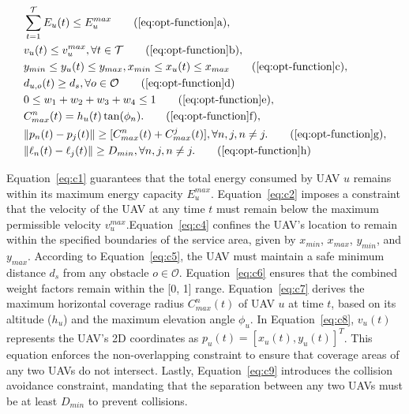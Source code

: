 \documentclass[conference]{IEEEtran}
\begin{document}
\begingroup
\allowdisplaybreaks
\begin{align}    
     & \sum_{t=1}^{\mathcal{T}} E_{u}(t) \leq E_u^{max} \tag{\ref{eq:opt-function}a}\label{eq:c1} ,\\
     & v_u(t) \leq v_u^{max},  \forall t \in \mathcal{T} \tag{\ref{eq:opt-function}b} \label{eq:c2} ,\\
    & y_{min} \leq y_u(t) \leq y_{max} , x_{min} \leq x_u(t) \leq x_{max}
    \tag{\ref{eq:opt-function}c}\label{eq:c4} ,\\
    &  d_{u,o}(t) \geq d_s, \forall o \in \mathcal{O}
    \tag{\ref{eq:opt-function}d}\label{eq:c5}\\
    &  0 \leq w_1 + w_2 + w_3 + w_4 \leq 1	
    \tag{\ref{eq:opt-function}e}\label{eq:c6} ,\\
    & C_{max}^n(t) = h_u(t)\tan(\phi_n).
    \tag{\ref{eq:opt-function}f}\label{eq:c7} ,\\
    & \|p_n(t) - p_j(t)\| \geq [C_{max}^n(t) + C_{max}^j(t)] , \forall n, j, n \neq j.
    \tag{\ref{eq:opt-function}g}\label{eq:c8} ,\\
    & \|\ell_n(t) - \ell_j(t)\| \geq D_{min}, \forall n, j, n \neq j.
    \tag{\ref{eq:opt-function}h}\label{eq:c9}
\end{align}
\endgroup



Equation~\eqref{eq:c1} guarantees that the total energy consumed by UAV $u$ remains within its maximum energy capacity $E_u^{max}$. Equation~\eqref{eq:c2} imposes a constraint that the velocity of the UAV at any time $t$ must remain below the maximum permissible velocity $v_u^{max}$.Equation~\eqref{eq:c4} confines the UAV's location to remain within the specified boundaries of the service area, given by $x_{min}$, $x_{max}$, $y_{min}$, and $y_{max}$. According to Equation~\eqref{eq:c5}, the UAV must maintain a safe minimum distance $d_s$ from any obstacle $o \in \mathcal{O}$. Equation~\eqref{eq:c6} ensures that the combined weight factors remain within the [0, 1] range. Equation~\eqref{eq:c7} derives the maximum horizontal coverage radius $C_{max}^n(t)$ of UAV $u$ at time $t$, based on its altitude ($h_u$) and the maximum elevation angle $\phi_u$. In Equation~\eqref{eq:c8}, $v_u(t)$ represents the UAV’s 2D coordinates as $p_u(t) = [x_u(t), y_u(t)]^T$. This equation enforces the non-overlapping constraint to ensure that coverage areas of any two UAVs do not intersect. Lastly, Equation~\eqref{eq:c9} introduces the collision avoidance constraint, mandating that the separation between any two UAVs must be at least $D_{min}$ to prevent collisions.
\end{document}
